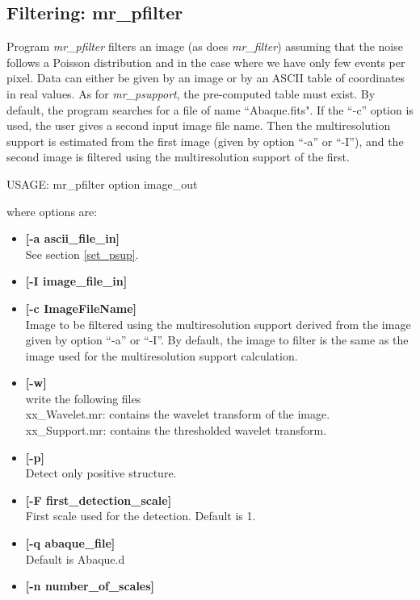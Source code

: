 \begin{itemize}
\subsection{Filtering: mr\_pfilter}
Program {\em mr\_pfilter} filters an image (as does {\em mr\_filter})
assuming  that the noise follows a Poisson distribution and in the case 
where we have only few events per pixel.
Data can either be given by an image or by 
an ASCII table of coordinates in real values.
As for {\em mr\_psupport}, the pre-computed table must exist. By default,
the program searches for a file of name ``Abaque.fits".
If the ``-c'' option is used, the user gives a second input image file name.
Then the multiresolution support is estimated from the first image
(given by option ``-a'' or ``-I''), and the second image is filtered
using the multiresolution support of the first.
{\bf
\begin{center}
 USAGE: mr\_pfilter option image\_out
\end{center}}
where options are:
\begin{itemize}
\baselineskip=0.4truecm
\itemsep=0.1truecm
\item {\bf [-a ascii\_file\_in]}  \\
See section \ref{set_psup}.
\item {\bf [-I image\_file\_in]} 
\item {\bf [-c ImageFileName]}  \\
Image to be filtered using the multiresolution support
derived from the image given by option ``-a'' or ``-I''.
By default, the image to filter is the same as the image
used for the multiresolution support calculation.
\item {\bf [-w]}  \\
write the following files \\
xx\_Wavelet.mr: contains the wavelet transform of the image. \\
xx\_Support.mr: contains the thresholded  wavelet transform.
\item {\bf [-p]}  \\
Detect only positive structure.
\item {\bf [-F first\_detection\_scale]} \\
First scale used for the detection. Default is 1.
\item {\bf [-q abaque\_file]}  \\
Default is Abaque.d
\item {\bf [-n number\_of\_scales]}  \\

\end{itemize}
\end{itemize}
